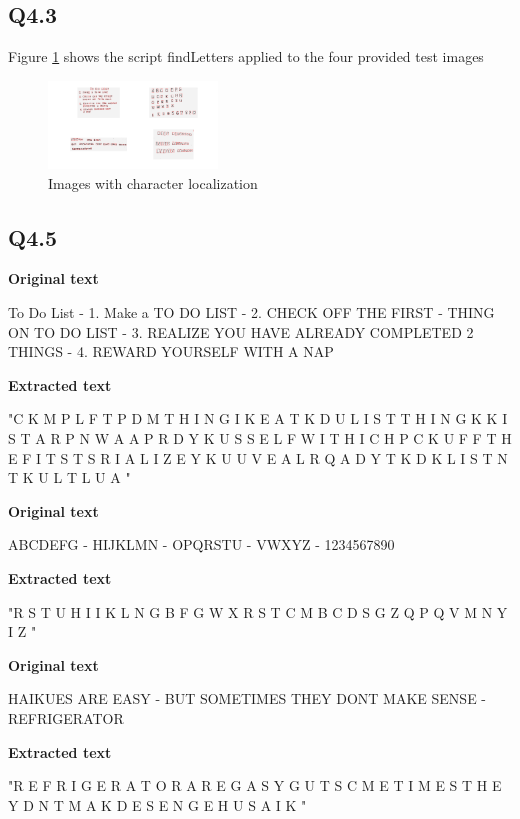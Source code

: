 \documentclass[12pt]{article}
\begin{document}
\subsection{Q4.3}
Figure \ref{fig:charboxes} shows the script findLetters applied to the four provided test images

\begin{figure}[H]
\centering
\includegraphics[page=1,width=0.4\textwidth]{char_boxes}
\caption{Images with character localization} 
\label{fig:charboxes}
\end{figure}   


\subsection{Q4.5}
\textbf { Original text }
 
To Do List  - 1. Make a TO DO LIST  - 2. CHECK OFF THE FIRST - THING ON TO DO LIST - 3. REALIZE YOU HAVE ALREADY COMPLETED 2 THINGS - 4. REWARD YOURSELF WITH A NAP

\bigskip

\textbf { Extracted text }

"C K M P L F T P D M T H I N G I  K E A T K D U L I S T  T H I N G K K I S  T A R P N W A A P R D Y K U S S E L F W I T H  I C H P C K U F F T H E F I T S T  S R I A L I Z E Y K U U V E A L R Q A D Y  T K D K L I S T  N T K U L T  L U A  "

\bigskip

\textbf { Original text }

ABCDEFG - HIJKLMN - OPQRSTU - VWXYZ - 1234567890

\bigskip

\textbf { Extracted text }

"R S T U  H I I K L  N G  B F G  W X  R S T C  M B C D  S G  Z  Q  P Q  V  M N  Y  I Z  "

\bigskip

\textbf { Original text }

HAIKUES ARE EASY - BUT SOMETIMES THEY DONT MAKE SENSE - REFRIGERATOR

\bigskip

\textbf { Extracted text }

"R E F R I G E R A T O R  A R E G A S Y  G U T S C M E T I M E S T H E Y D N T M A K  D E S E N G E  H  U S  A I K  "
\end{document}
